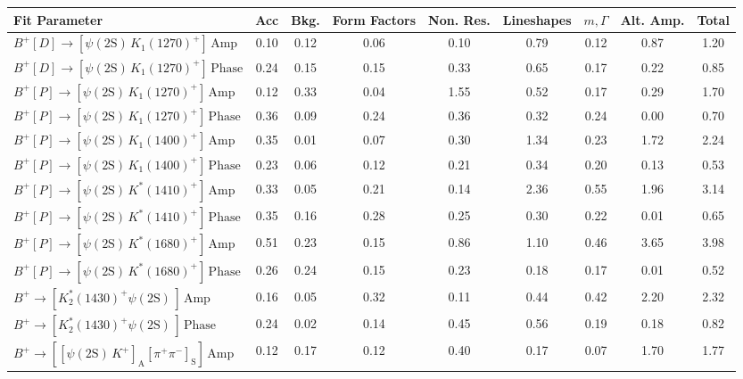 \begin{tabular}{l  c  c  c  c  c  c  c  | c }
\hline
\hline
Fit Parameter & Acc & Bkg. & Form Factors & Non. Res. & Lineshapes & $m,\Gamma$ & Alt. Amp. &  Total  \\ 
\hline
$B^{+}\left[D\right]\rightarrow \left[\psi(\text{2S})\,K_{1}(1270)^{+}\right]\,\text{Amp}$ & 0.10 & 0.12 & 0.06 & 0.10 & 0.79 & 0.12 & 0.87 & 1.20 \\ 
$B^{+}\left[D\right]\rightarrow \left[\psi(\text{2S})\,K_{1}(1270)^{+}\right]\,\text{Phase}$ & 0.24 & 0.15 & 0.15 & 0.33 & 0.65 & 0.17 & 0.22 & 0.85 \\ 
$B^{+}\left[P\right]\rightarrow \left[\psi(\text{2S})\,K_{1}(1270)^{+}\right]\,\text{Amp}$ & 0.12 & 0.33 & 0.04 & 1.55 & 0.52 & 0.17 & 0.29 & 1.70 \\ 
$B^{+}\left[P\right]\rightarrow \left[\psi(\text{2S})\,K_{1}(1270)^{+}\right]\,\text{Phase}$ & 0.36 & 0.09 & 0.24 & 0.36 & 0.32 & 0.24 & 0.00 & 0.70 \\ 
$B^{+}\left[P\right]\rightarrow \left[\psi(\text{2S})\,K_{1}(1400)^{+}\right]\,\text{Amp}$ & 0.35 & 0.01 & 0.07 & 0.30 & 1.34 & 0.23 & 1.72 & 2.24 \\ 
$B^{+}\left[P\right]\rightarrow \left[\psi(\text{2S})\,K_{1}(1400)^{+}\right]\,\text{Phase}$ & 0.23 & 0.06 & 0.12 & 0.21 & 0.34 & 0.20 & 0.13 & 0.53 \\ 
$B^{+}\left[P\right]\rightarrow \left[\psi(\text{2S})\,K^{*}(1410)^{+}\right]\,\text{Amp}$ & 0.33 & 0.05 & 0.21 & 0.14 & 2.36 & 0.55 & 1.96 & 3.14 \\ 
$B^{+}\left[P\right]\rightarrow \left[\psi(\text{2S})\,K^{*}(1410)^{+}\right]\,\text{Phase}$ & 0.35 & 0.16 & 0.28 & 0.25 & 0.30 & 0.22 & 0.01 & 0.65 \\ 
$B^{+}\left[P\right]\rightarrow \left[\psi(\text{2S})\,K^{*}(1680)^{+}\right]\,\text{Amp}$ & 0.51 & 0.23 & 0.15 & 0.86 & 1.10 & 0.46 & 3.65 & 3.98 \\ 
$B^{+}\left[P\right]\rightarrow \left[\psi(\text{2S})\,K^{*}(1680)^{+}\right]\,\text{Phase}$ & 0.26 & 0.24 & 0.15 & 0.23 & 0.18 & 0.17 & 0.01 & 0.52 \\ 
$B^{+}\rightarrow \left[K_{2}^{*}(1430)^{+}\psi(\text{2S})\,\right]\,\text{Amp}$ & 0.16 & 0.05 & 0.32 & 0.11 & 0.44 & 0.42 & 2.20 & 2.32 \\ 
$B^{+}\rightarrow \left[K_{2}^{*}(1430)^{+}\psi(\text{2S})\,\right]\,\text{Phase}$ & 0.24 & 0.02 & 0.14 & 0.45 & 0.56 & 0.19 & 0.18 & 0.82 \\ 
$B^{+}\rightarrow \left[\left[\psi(\text{2S})\,K^{+}\right]_{\text{A}}\left[\pi^{+}\pi^{-}\right]_{\text{S}}\right]\,\text{Amp}$ & 0.12 & 0.17 & 0.12 & 0.40 & 0.17 & 0.07 & 1.70 & 1.77 \\ 

\end{tabular}
